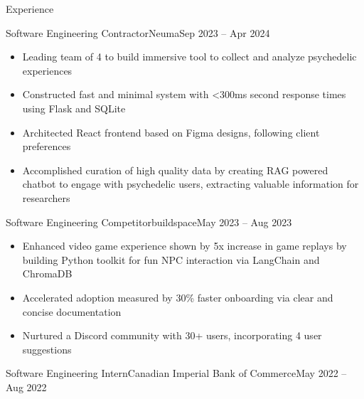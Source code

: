 \documentclass[]{mcdowellcv}
\begin{document}
\makeheader
      

\begin{cvsection}{Experience}
	\begin{cvsubsection}{Software Engineering Contractor}{Neuma}{Sep 2023 -- Apr 2024}
		            
		\begin{itemize}%
			\item Leading team of 4 to build immersive tool to collect and analyze psychedelic experiences
			\item Constructed fast and minimal system with \textless{}300ms second response times using Flask and SQLite
			\item Architected React frontend based on Figma designs, following client preferences
			\item Accomplished curation of high quality data by creating RAG powered chatbot to engage with psychedelic users, extracting valuable information for researchers
		\end{itemize}
	\end{cvsubsection}
	\begin{cvsubsection}{Software Engineering Competitor}{buildspace}{May 2023 -- Aug 2023}
		            
		\begin{itemize}%
			\item Enhanced video game experience shown by 5x increase in game replays by building Python toolkit for fun NPC interaction via LangChain and ChromaDB
			\item Accelerated adoption measured by 30\% faster onboarding via clear and concise documentation
			\item Nurtured a Discord community with 30+ users, incorporating 4 user suggestions
		\end{itemize}
	\end{cvsubsection}
	\begin{cvsubsection}{Software Engineering Intern}{Canadian Imperial Bank of Commerce}{May 2022 -- Aug 2022}
		            

\end{cvsubsection}
\end{cvsection}
\end{document}
